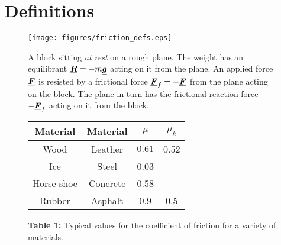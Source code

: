 




\addtolength{\topmargin}{-0.7 cm}
\setlength{\columnsep}{22pt}


\section{Definitions}
\begin{wrapfigure}{r}{7cm}\vspace{-2cm}
\center
\texttt{[image: figures/friction\_defs.eps]}
\caption{A block sitting \textit{at rest }on a rough plane.  The weight has an equilibrant $\mathit{\underline{\boldsymbol{R}}} = - m\mathit{\underline{\boldsymbol{g}}}$ acting on it from the plane.  An applied force $\mathit{\underline{\boldsymbol{F}}}$ is resisted by a frictional force $\mathit{\underline{\boldsymbol{F}}}_f = -\mathit{\underline{\boldsymbol{F}}}$ from the plane acting on the block.  The plane in turn has the frictional reaction force $-\mathit{\underline{\boldsymbol{F}}}_f$ acting on it from the block.}\vspace{1.0cm}
\label{fig:friction-defs}

  \begin{tabular}{|c|c|c|c|}
\hline
Material & Material & $\mu$ & $\mu_k$\\
\hline
\hline
   Wood & Leather &$0.61$& 0.52 \\
   \hline
   Ice & Steel &0.03& \\
    \hline
   Horse shoe   & Concrete &0.58& \\
 \hline
   Rubber & Asphalt &0.9&0.5 \\
   \hline

  \end{tabular}
  \caption*{{\bf Table 1:} Typical values for the coefficient of friction for a variety of materials.}\vspace{-0.7cm}\label{tab:coeffs}
 \end{wrapfigure}

